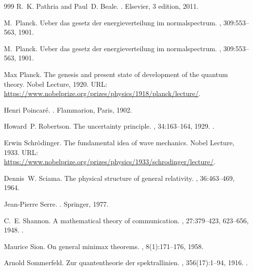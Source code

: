 \begin{thebibliography}{999}
R.~K. Pathria and Paul~D. Beale.
.
\newblock Elsevier, 3 edition, 2011.

M.~Planck.
\newblock Ueber das gesetz der energieverteilung im normalspectrum.
, 309:553--563, 1901.

M.~Planck.
\newblock Ueber das gesetz der energieverteilung im normalspectrum.
, 309:553--563, 1901.

Max Planck.
\newblock The genesis and present state of development of the quantum theory.
\newblock Nobel Lecture, 1920.
\newblock URL:
  \url{https://www.nobelprize.org/prizes/physics/1918/planck/lecture/}.

Henri Poincaré.
.
\newblock Flammarion, Paris, 1902.

Howard~P. Robertson.
\newblock The uncertainty principle.
, 34:163--164, 1929.
\newblock \href {https://doi.org/10.1103/PhysRev.34.163}
  {}.

Erwin Schrödinger.
\newblock The fundamental idea of wave mechanics.
\newblock Nobel Lecture, 1933.
\newblock URL:
  \url{https://www.nobelprize.org/prizes/physics/1933/schrodinger/lecture/}.

Dennis~W. Sciama.
\newblock The physical structure of general relativity.
, 36:463--469, 1964.

Jean-Pierre Serre.
.
\newblock Springer, 1977.

C.~E. Shannon.
\newblock A mathematical theory of communication.
, 27:379--423, 623--656, 1948.
\newblock \href {https://doi.org/10.1002/j.1538-7305.1948.tb01338.x}
  {}.

Maurice Sion.
\newblock On general minimax theorems.
, 8(1):171--176, 1958.

Arnold Sommerfeld.
\newblock Zur quantentheorie der spektrallinien.
, 356(17):1--94, 1916.
\newblock \href {https://doi.org/10.1002/andp.19163561702}
  {}.


\end{thebibliography}

